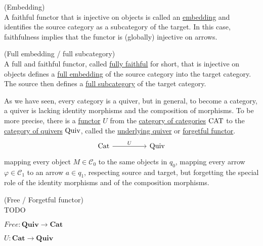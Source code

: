 \begin{definition}{(Embedding)}\label{def:embedding}\\
A faithful functor that is injective on objects is called an \ul{embedding} and identifies the source category
as a subcategory of the target. In this case, faithfulness implies that the functor is (globally) injective on arrows.
\end{definition}

\begin{definition}{(Full embedding / full subcategory)}\label{def:full_fully}\\
A full and faithful functor, called \ul{fully faithful} for short, that is injective on objects defines a \ul{full embedding} of the
source category into the target category. The source then defines a \ul{full subcategory} of the target category.
\end{definition}

\noindent As we have seen, every category is a quiver, but in general, to become a category, a quiver is lacking identity morphisms
and the composition of morphisms. To be more precise, there is a \ul{functor} $U$ from the \ul{category of categories} $\textup{CAT}$ to the
\ul{category of quivers} $\textup{Quiv}$, called the \ul{underlying quiver} or \ul{forgetful functor}.
\[
\begin{tikzcd}
\textup{Cat} \arrow[rr,"U"] &  & \textup{Quiv}
\end{tikzcd}
\]
mapping every object $M \in \mathcal{C}_{0}$ to the same objects in $q_{0}$, mapping every arrow $\varphi \in \mathcal{C}_{1}$ to 
an arrow $a \in q_{1}$, respecting source and target, but forgetting the special role of the identity morphisms and of the composition morphisms.

\begin{example}{(Free / Forgetful functor)}\label{ex:forgetful_functor}\\
TODO

$Free : \mathbf{Quiv} \rightarrow \mathbf{Cat}$

$U : \mathbf{Cat} \rightarrow \mathbf{Quiv}$
\end{example}

